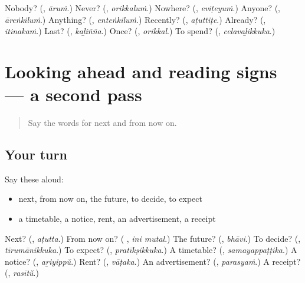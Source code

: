 \begin{tcolorbox}[breakable,colback=teal!4,colframe=teal!35!black,title={Before you move on}]
Nobody? (\textbf{}, \emph{āruṁ}.) Never? (\textbf{}, \emph{orikkaluṁ}.) Nowhere? (\textbf{}, \emph{eviṭeyuṁ}.) Anyone? (\textbf{}, \emph{āreṅkiluṁ}.) Anything? (\textbf{}, \emph{enteṅkiluṁ}.) Recently? (\textbf{}, \emph{aṭuttiṭe}.) Already? (\textbf{}, \emph{itinakaṁ}.) Last? (\textbf{}, \emph{kaḻiñña}.) Once? (\textbf{}, \emph{orikkal}.) To spend? (\textbf{}, \emph{celavaḻikkuka}.)
\end{tcolorbox}
\section[(dialogue)]{Looking ahead and reading signs — a second pass}

\label{lesson:ML-R180-second-pass-looking-ahead-and-reading-signs}



\begin{quote}
Say the words for next and from now on.
\end{quote}

\subsection*{Your turn}
Say these aloud:

\begin{itemize}
\raggedright
  \item next, from now on, the future, to decide, to expect
  \item a timetable, a notice, rent, an advertisement, a receipt
\end{itemize}

\begin{tcolorbox}[breakable,colback=teal!4,colframe=teal!35!black,title={Before you move on}]
Next? (\textbf{}, \emph{aṭutta}.) From now on? (\textbf{ }, \emph{ini mutal}.) The future? (\textbf{}, \emph{bhāvi}.) To decide? (\textbf{}, \emph{tīrumānikkuka}.) To expect? (\textbf{}, \emph{pratīkṣikkuka}.) A timetable? (\textbf{}, \emph{samayappaṭṭika}.) A notice? (\textbf{}, \emph{aṟiyippŭ}.) Rent? (\textbf{}, \emph{vāṭaka}.) An advertisement? (\textbf{}, \emph{parasyaṁ}.) A receipt? (\textbf{}, \emph{rasītŭ}.)
\end{tcolorbox}
